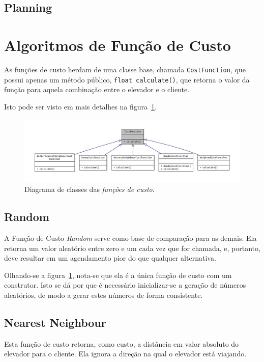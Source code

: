 \subsection{\label{model:schedulers:planning}Planning}
\lipsum[5]

\section{\label{model:costfunctions}Algoritmos de Função de Custo}
As funções de custo herdam de uma classe base, chamada \texttt{CostFunction},
que possui apenas um método público, \texttt{float calculate()}, que retorna o
valor da função para aquela combinação entre o elevador e o cliente.

Isto pode ser visto em mais detalhes na figura~\ref{fig:model:costfunction:uml:base}.

\begin{figure}[htb]
  \centering
  \includegraphics[scale=0.8]{doc/latex/class_cost_function__inherit__graph}
  \caption{Diagrama de classes das \textit{funções de custo}.}
  \label{fig:model:costfunction:uml:base}
\end{figure}

\subsection{\label{model:costfunctions:random}Random}
A Função de Custo \textit{Random} serve como base de comparação para as demais.
Ela retorna um valor aleatório entre zero e um cada vez que for chamada, e,
portanto, deve resultar em um agendamento pior do que qualquer alternativa.

Olhando-se a figura~\ref{fig:model:costfunction:uml:base}, nota-se que ela é a
única função de custo com um construtor. Isto se dá por que é necessário
inicializar-se a geração de números aleatórios, de modo a gerar estes números de
forma consistente.

\subsection{\label{model:costfunctions:nn}Nearest Neighbour}
Esta função de custo retorna, como custo, a distância em valor absoluto do
elevador para o cliente. Ela ignora a direção na qual o elevador está viajando.

